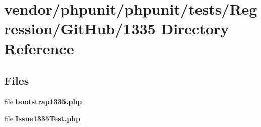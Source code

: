 \section{vendor/phpunit/phpunit/tests/\+Regression/\+Git\+Hub/1335 Directory Reference}
\label{dir_d8a5de5e2b1529571477c7fc226c27ef}
\subsection*{Files}
\begin{DoxyCompactItemize}
\item 
file {\bf bootstrap1335.\+php}
\item 
file {\bf Issue1335\+Test.\+php}
\end{DoxyCompactItemize}
